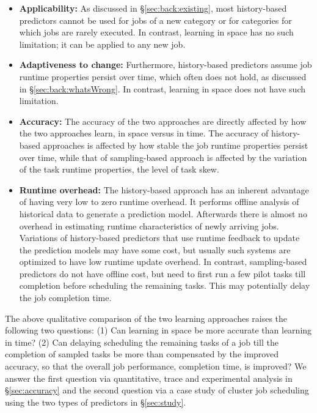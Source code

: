 \begin{itemize}%
\item {\bf Applicability:} As discussed in \S\ref{sec:back:existing}, most history-based
predictors cannot be used for jobs of a new category or for categories
for which jobs are rarely executed.  In contrast, learning in space
has no such limitation; it can be applied to any new job.
\item {\bf Adaptiveness to change:} Furthermore, history-based predictors assume
job runtime properties persist over time, which often does not hold, as discussed 
in \S\ref{sec:back:whatsWrong}. In contrast, learning in space does not have such 
limitation.
\item {\bf Accuracy:}
The accuracy of the two approaches are directly affected by
how the two approaches learn, \ie in space versus in time.
The accuracy of history-based approaches is affected by how stable
the job runtime properties persist over time, while that  of
sampling-based approach is affected by the variation of the task runtime properties,
\ie the level of task skew.
%
\item {\bf Runtime overhead:} The history-based approach
has an inherent advantage of having very low to zero runtime
overhead. It performs offline analysis of historical data to generate
a prediction model.
\rm{Afterwards there is almost no overhead in
estimating runtime characteristics of newly arriving jobs. Variations
of history-based predictors that use runtime feedback to update the
prediction models may have some cost, but usually such systems are
optimized to have low runtime update overhead.}  In contrast,
sampling-based predictors do not have offline cost, but
need to first run a few pilot tasks till completion
before scheduling the remaining tasks. This may potentially
delay the job completion time.
\end{itemize}

The above qualitative comparison of the two learning approaches raises the
following two questions:
(1) Can learning in space be more accurate than learning in time?
(2) Can {delaying scheduling} the remaining tasks of a job till the completion
of sampled tasks be more than compensated by the improved accuracy, so that the
overall job performance, \eg completion time, is improved?
%
We answer the first question via quantitative, trace and experimental analysis
in \S\ref{sec:accuracy} and the second question via a case study of cluster job
scheduling using the two types of predictors in \S\ref{sec:study}.


